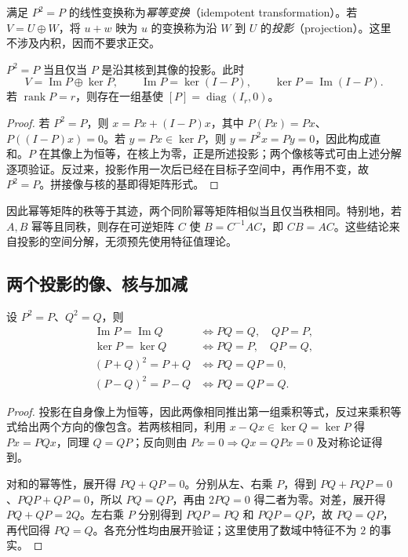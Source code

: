 \begin{definition}
满足 $P^2=P$ 的线性变换称为\emph{幂等变换}（idempotent transformation）。若 $V=U\oplus W$，将 $u+w$ 映为 $u$ 的变换称为沿 $W$ 到 $U$ 的\emph{投影}（projection）。这里不涉及内积，因而不要求正交。
\end{definition}

\begin{theorem}
\label{thm:xie-ex-idempotent-projection}
$P^2=P$ 当且仅当 $P$ 是沿其核到其像的投影。此时
\[
    V=\operatorname{Im}P\oplus\ker P,\qquad
    \operatorname{Im}P=\ker(I-P),\qquad
    \ker P=\operatorname{Im}(I-P).
\]
若 $\operatorname{rank}P=r$，则存在一组基使 $[P]=\operatorname{diag}(I_r,0)$。
\end{theorem}

\begin{proof}
若 $P^2=P$，则 $x=Px+(I-P)x$，其中 $P(Px)=Px$、$P((I-P)x)=0$。若 $y=Px\in\ker P$，则 $y=P^2x=Py=0$，因此构成直和。$P$ 在其像上为恒等，在核上为零，正是所述投影；两个像核等式可由上述分解逐项验证。反过来，投影作用一次后已经在目标子空间中，再作用不变，故 $P^2=P$。拼接像与核的基即得矩阵形式。
\end{proof}

因此幂等矩阵的秩等于其迹，两个同阶幂等矩阵相似当且仅当秩相同。特别地，若 $A,B$ 幂等且同秩，则存在可逆矩阵 $C$ 使 $B=C^{-1}AC$，即 $CB=AC$。这些结论来自投影的空间分解，无须预先使用特征值理论。

\subsection{两个投影的像、核与加减}

\begin{proposition}
\label{prop:xie-ex-two-projections}
设 $P^2=P$、$Q^2=Q$，则
\[
\begin{aligned}
    \operatorname{Im}P=\operatorname{Im}Q
    &\iff PQ=Q,\quad QP=P,\\
    \ker P=\ker Q
    &\iff PQ=P,\quad QP=Q,\\
    (P+Q)^2=P+Q
    &\iff PQ=QP=0,\\
    (P-Q)^2=P-Q
    &\iff PQ=QP=Q.
\end{aligned}
\]
\end{proposition}

\begin{proof}
投影在自身像上为恒等，因此两像相同推出第一组乘积等式，反过来乘积等式给出两个方向的像包含。若两核相同，利用 $x-Qx\in\ker Q=\ker P$ 得 $Px=PQx$，同理 $Q=QP$；反向则由 $Px=0\Rightarrow Qx=QPx=0$ 及对称论证得到。

对和的幂等性，展开得 $PQ+QP=0$。分别从左、右乘 $P$，得到 $PQ+PQP=0$、$PQP+QP=0$，所以 $PQ=QP$，再由 $2PQ=0$ 得二者为零。对差，展开得 $PQ+QP=2Q$。左右乘 $P$ 分别得到 $PQP=PQ$ 和 $PQP=QP$，故 $PQ=QP$，再代回得 $PQ=Q$。各充分性均由展开验证；这里使用了数域中特征不为 $2$ 的事实。
\end{proof}

